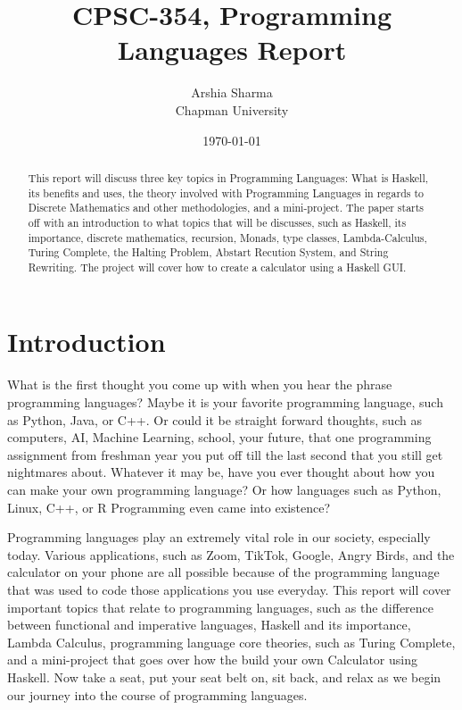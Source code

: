 \documentclass{article}
\title{CPSC-354, Programming Languages Report}
\author{Arshia Sharma \\ Chapman University}
\date{\today}
\begin{document}
\maketitle

\begin{abstract}
\noindent
This report will discuss three key topics in Programming Languages: What is Haskell, its benefits and uses, the theory involved with Programming Languages in regards to Discrete Mathematics and other methodologies, and a mini-project. The paper starts off with an introduction to what topics that will be discusses, such as Haskell, its importance, discrete mathematics, recursion, Monads, type classes, Lambda-Calculus, Turing Complete, the Halting Problem, Abstart Recution System, and String Rewriting. The project will cover how to create a calculator using a Haskell GUI. 

\end{abstract}

\tableofcontents

\section{Introduction}\label{intro}

What is the first thought you come up with when you hear the phrase programming languages? Maybe it is your favorite programming language, such as Python, Java, or C++. Or could it be straight forward thoughts, such as computers, AI, Machine Learning, school, your future, that one programming assignment from freshman year you put off till the last second that you still get nightmares about. Whatever it may be, have you ever thought about how you can make your own programming language? Or how languages such as Python, Linux, C++, or R Programming even came into existence? 

\medskip\noindent
Programming languages play an extremely vital role in our society, especially today. Various applications, such as Zoom, TikTok, Google, Angry Birds, and the calculator on your phone are all possible because of the programming language that was used to code those applications you use everyday. This report will cover important topics that relate to programming languages, such as the difference between functional and imperative languages, Haskell and its importance, Lambda Calculus, programming language core theories, such as Turing Complete, and a mini-project that goes over how the build your own Calculator using Haskell. Now take a seat, put your seat belt on, sit back, and relax as we begin our journey into the course of programming languages.
\end{document}
